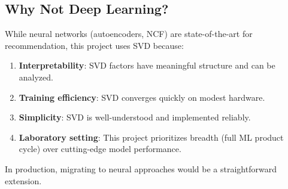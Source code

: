 \subsection{Why Not Deep Learning?}

While neural networks (autoencoders, NCF) are state-of-the-art for recommendation, this project uses SVD 
because:

\begin{enumerate}
  \item \textbf{Interpretability}: SVD factors have meaningful structure and can be analyzed.
  \item \textbf{Training efficiency}: SVD converges quickly on modest hardware.
  \item \textbf{Simplicity}: SVD is well-understood and implemented reliably.
  \item \textbf{Laboratory setting}: This project prioritizes breadth (full ML product cycle) over 
  cutting-edge model performance.
\end{enumerate}

In production, migrating to neural approaches would be a straightforward extension.
